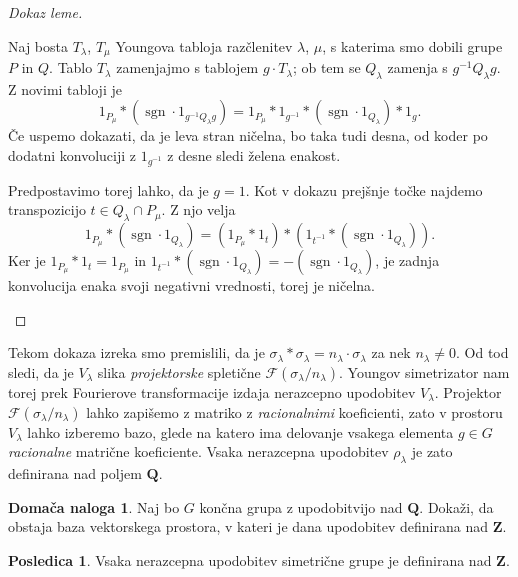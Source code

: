 \documentclass[11pt]{book}
\def\ZZ{\mathbf{Z}}
\def\QQ{\mathbf{Q}}
\def\Fcal{\mathcal{F}}
\def\youngsym{\sigma_{\lambda}}
\DeclareMathOperator\sgn{sgn}
\theoremstyle{definition}
\theoremstyle{zgled}
\theoremstyle{odprtproblem}
\theoremstyle{domacanaloga}
\newtheorem*{domacanaloga}{Domača naloga}
\newenvironment{dokaz}
    {\color{siva}\begin{proof}}
    {\end{proof}}
\theoremstyle{izrek}
\newtheorem*{posledica}{Posledica}
\begin{document}
\begin{dokaz}[Dokaz leme]
\begin{enumerate}
    Naj bosta $T_{\lambda}$, $T_{\mu}$ Youngova tabloja razčlenitev $\lambda$, $\mu$, s katerima smo dobili grupe $P$ in $Q$. Tablo $T_{\lambda}$ zamenjajmo s tablojem $g \cdot T_{\lambda}$; ob tem se $Q_{\lambda}$ zamenja s $g^{-1} Q_{\lambda} g$. Z novimi tabloji je
    \[
        1_{P_\mu} * (\sgn \cdot 1_{g^{-1} Q_{\lambda} g}) = 1_{P_\mu} * 1_{g^{-1}} * (\sgn \cdot 1_{Q_{\lambda}}) * 1_g.
    \]
    Če uspemo dokazati, da je leva stran ničelna, bo taka tudi desna, od koder po dodatni konvoluciji z $1_{g^{-1}}$ z desne sledi želena enakost.

    Predpostavimo torej lahko, da je $g = 1$. Kot v dokazu prejšnje točke najdemo transpozicijo $t \in Q_{\lambda} \cap P_{\mu}$. Z njo velja
    \[
        1_{P_{\mu}} * (\sgn \cdot 1_{Q_{\lambda}}) = 
        \left( 1_{P_{\mu}} * 1_t \right) * \left( 1_{t^{-1}} * (\sgn \cdot 1_{Q_{\lambda}}) \right).
    \]
    Ker je $1_{P_{\mu}} * 1_t = 1_{P_{\mu}}$ in $1_{t^{-1}} * (\sgn \cdot 1_{Q_{\lambda}}) = - (\sgn \cdot 1_{Q_{\lambda}})$, je zadnja konvolucija enaka svoji negativni vrednosti, torej je ničelna.
\end{enumerate}
\end{dokaz}

Tekom dokaza izreka smo premislili, da je $\youngsym * \youngsym = n_{\lambda} \cdot \youngsym$ za nek $n_{\lambda} \neq 0$. Od tod sledi, da je $V_{\lambda}$ slika \emph{projektorske} spletične $\Fcal(\youngsym / n_{\lambda})$. Youngov simetrizator nam torej prek Fourierove transformacije izdaja nerazcepno upodobitev $V_{\lambda}$. Projektor $\Fcal(\youngsym / n_{\lambda})$ lahko zapišemo z matriko z \emph{racionalnimi} koeficienti, zato v prostoru $V_{\lambda}$ lahko izberemo bazo, glede na katero ima delovanje vsakega elementa $g \in G$ \emph{racionalne} matrične koeficiente. Vsaka nerazcepna upodobitev $\rho_{\lambda}$ je zato definirana nad poljem $\QQ$.

\begin{domacanaloga}
Naj bo $G$ končna grupa z upodobitvijo nad $\QQ$. Dokaži, da obstaja baza vektorskega prostora, v kateri je dana upodobitev definirana nad $\ZZ$.
\end{domacanaloga}

\begin{posledica}
Vsaka nerazcepna upodobitev simetrične grupe je definirana nad $\ZZ$.
\end{posledica}    
\end{document}
